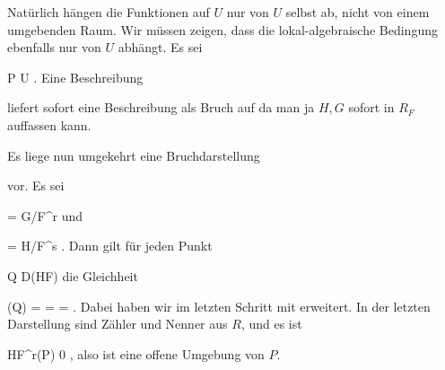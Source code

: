 {





Natürlich hängen die Funktionen auf $U$ nur von $U$ selbst ab, nicht von einem umgebenden Raum. Wir müssen zeigen, dass die lokal-algebraische Bedingung ebenfalls nur von $U$ abhängt. Es sei

\mavergleichskette
{\vergleichskette
{ P
}
{ \in }{ U
}
{  }{
}
{    }{
}
{   }{
}
}
{}{}{.}
Eine Beschreibung

 {  }

liefert sofort eine Beschreibung als Bruch auf
 da man ja $H,G$ sofort in $R_F$ auffassen kann.

Es liege nun umgekehrt eine Bruchdarstellung

 {  }

vor. Es sei

\mavergleichskette
{\vergleichskette
{ 
}
{ = }{ G/F^r
}
{  }{
}
{    }{
}
{   }{
}
}
{}{}{}
und

\mavergleichskette
{\vergleichskette
{ 
}
{ = }{ H/F^s
}
{  }{
}
{    }{
}
{   }{
}
}
{}{}{.}
Dann gilt für jeden Punkt

\mavergleichskette
{\vergleichskette
{ Q
}
{ \in }{ D(HF)
}
{  }{
}
{    }{
}
{   }{
}
}
{}{}{}
die Gleichheit

\mavergleichskettedisp
{\vergleichskette
{ \varphi(Q)
}
{ =} { 
}
{ =} { 
}
{ =} { 
}
{ } {
}
}
{}{}{.}
Dabei haben wir im letzten Schritt mit
 erweitert. In der letzten Darstellung sind Zähler und Nenner aus $R$, und es ist

\mavergleichskette
{\vergleichskette
{ HF^r(P)
}
{ \neq }{ 0
}
{  }{
}
{    }{
}
{   }{
}
}
{}{}{,}
also ist
 eine offene Umgebung von $P$.




}






